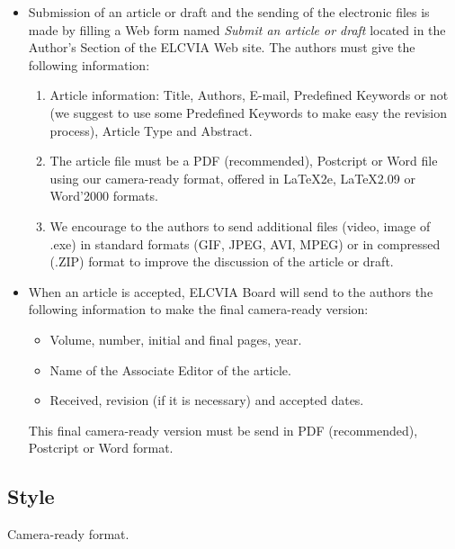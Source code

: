 \documentclass[twoside,a4paper,11pt]{article}
\begin{document}
\begin{itemize}
\item Submission of an article or draft and the sending of the electronic files
is made by filling a Web form named {\em Submit an article or draft} located 
in the Author's Section of the ELCVIA Web site. The authors must give the 
following information:

\begin{enumerate}

\item Article information: Title, Authors, E-mail, Predefined Keywords 
or not (we suggest to use some Predefined Keywords to make easy the 
revision process), Article Type and Abstract.

\item The article file must be a PDF (recommended),  Postcript or Word file using our 
camera-ready format, offered in \LaTeX 2e, \LaTeX 2.09 or  Word'2000 formats. 

\item We encourage to the authors to send additional files (video, image of .exe) 
in standard formats (GIF, JPEG, AVI, MPEG) or in compressed (.ZIP) format to 
improve the discussion of the article or draft.

\end{enumerate}

\item When an article is accepted, ELCVIA Board will send to the authors the following 
information to make the final camera-ready version:

\begin{itemize}
\item Volume, number, initial and final pages, year.

\item Name of the Associate Editor of the article.

\item Received, revision (if it is necessary) and accepted dates.
\end{itemize}

This final camera-ready version must be send in PDF (recommended), Postcript 
or Word format.

\end{itemize}

\subsection{Style}

\noindent Camera-ready format.
\end{document}
